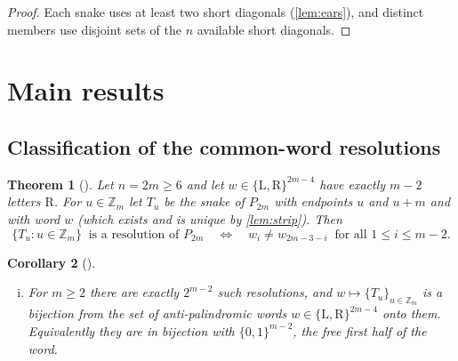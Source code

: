 \documentclass[11pt,a4paper]{article}
\newtheorem{theorem}{Theorem}[section]
\newtheorem{corollary}[theorem]{Corollary}
\theoremstyle{definition}
\theoremstyle{remark}
\newcommand{\Zd}{\ensuremath{\mathbb{Z}}}
\newcommand{\Li}{\mathrm{L}}
\newcommand{\Ri}{\mathrm{R}}
\begin{document}
\begin{proof}
Each snake uses at least two short diagonals (\cref{lem:ears}), and distinct members use
disjoint sets of the $n$ available short diagonals.
\end{proof}

\section{Main results}

\subsection{Classification of the common-word resolutions}

\begin{theorem}[\label{thm:classification}]
Let $n=2m\ge6$ and let $w\in\{\Li,\Ri\}^{2m-4}$ have exactly $m-2$ letters $\Ri$.  For
$u\in\Zd_m$ let $T_u$ be the snake of $P_{2m}$ with endpoints $u$ and $u+m$ and with word
$w$ (which exists and is unique by \cref{lem:strip}).  Then
\[
  \{T_u : u\in\Zd_m\}\ \text{ is a resolution of } P_{2m}
  \quad\Longleftrightarrow\quad
  w_i\ne w_{2m-3-i}\ \text{ for all } 1\le i\le m-2 . \tag{2}
\]
\end{theorem}

\begin{corollary}[\label{cor:count}]
\begin{enumerate}[(i)] Every resolution of $P_{2m}$ whose $m$ snakes follow a \emph{common
word} (each read from one of its ear vertices) is antipodal, and is of the form of
\cref{thm:classification}.
\item[$(ii)$] For $m\ge2$ there are exactly $2^{m-2}$ such resolutions, and
$w\mapsto\{T_u\}_{u\in\Zd_m}$ is a bijection from the set of anti-palindromic words
$w\in\{\Li,\Ri\}^{2m-4}$ onto them.  Equivalently they are in bijection with
$\{0,1\}^{m-2}$, the free first half of the word.
\end{enumerate}
\end{corollary}
\end{document}
